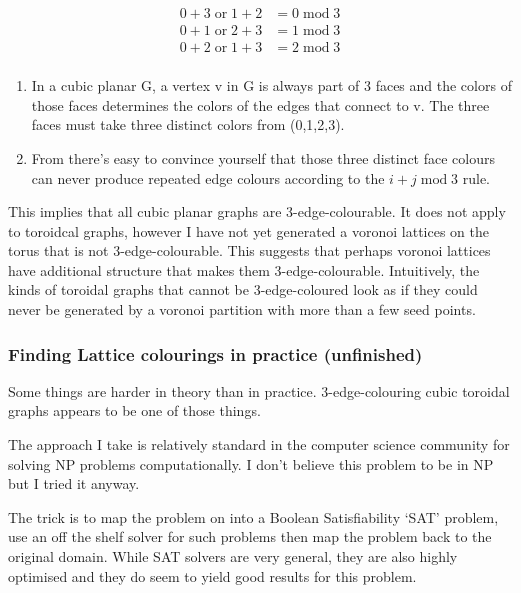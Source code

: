 \[\begin{align}
0 + 3 \;\mathrm{or}\; 1 + 2 &= 0 \;\mathrm{mod}\; 3\\ 
0 + 1 \;\mathrm{or}\; 2 + 3 &= 1 \;\mathrm{mod}\; 3\\
0 + 2 \;\mathrm{or}\;1 + 3 &= 2 \;\mathrm{mod}\; 3\\
\end{align}
\]

\begin{enumerate}
\def\labelenumi{\arabic{enumi}.}
\setcounter{enumi}{2}
\tightlist
\item
  In a cubic planar G, a vertex v in G is always part of 3 faces and the
  colors of those faces determines the colors of the edges that connect
  to v. The three faces must take three distinct colors from (0,1,2,3).
\item
  From there's easy to convince yourself that those three distinct face
  colours can never produce repeated edge colours according to the
  \(i+j \;\mathrm{mod}\; 3\) rule.
\end{enumerate}

This implies that all cubic planar graphs are 3-edge-colourable. It does
not apply to toroidcal graphs, however I have not yet generated a
voronoi lattices on the torus that is not 3-edge-colourable. This
suggests that perhaps voronoi lattices have additional structure that
makes them 3-edge-colourable. Intuitively, the kinds of toroidal graphs
that cannot be 3-edge-coloured look as if they could never be generated
by a voronoi partition with more than a few seed points.

\hypertarget{finding-lattice-colourings-in-practice-unfinished}{%
\subsubsection{Finding Lattice colourings in practice
(unfinished)}\label{finding-lattice-colourings-in-practice-unfinished}}

Some things are harder in theory than in practice. 3-edge-colouring
cubic toroidal graphs appears to be one of those things.

The approach I take is relatively standard in the computer science
community for solving NP problems computationally. I don't believe this
problem to be in NP but I tried it anyway.

The trick is to map the problem on into a Boolean Satisfiability `SAT'
problem, use an off the shelf solver for such problems then map the
problem back to the original domain. While SAT solvers are very general,
they are also highly optimised and they do seem to yield good results
for this problem.

